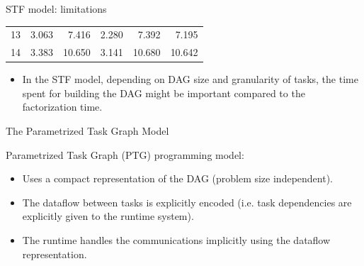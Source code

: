 \documentclass{beamer}
\newcommand{\db}[1]{\textcolor{mblue}{#1\xspace}}
\newcommand{\dd}[1]{\textcolor{gray!70}{#1\xspace}}
\begin{document}
\begin{frame}{STF model: limitations}
\begin{center}
{{\begin{tabular}{r|rr|rr|r}
        13 & \dd{3.063}                 & \dd{7.416}                 & \dd{2.280} & \dd{7.392}  & \dd{7.195}  \\
        14 & \dd{3.383}                 & \dd{10.650}                & \dd{3.141} & \dd{10.680} & \dd{10.642} \\
        \hline
    \end{tabular}}}  
  \end{center}
  \begin{itemize}
  \item In the STF model, depending on \alert{DAG size} and
    \alert{granularity} of tasks, the time spent for building the DAG
    might be important compared to the factorization time.
  \end{itemize}
\end{frame}

\begin{frame}{The Parametrized Task Graph Model}
  
  \alert{Parametrized Task Graph} (PTG) programming model:

  \begin{itemize}
  \item Uses a \db{compact representation} of the DAG (problem
    size independent).
  \item The dataflow between tasks is \db{explicitly} encoded
    (i.e. task dependencies are explicitly given to the runtime
    system).
  \item The runtime handles the communications implicitly using the
    dataflow representation.
  \end{itemize}

\end{frame}
\end{document}
